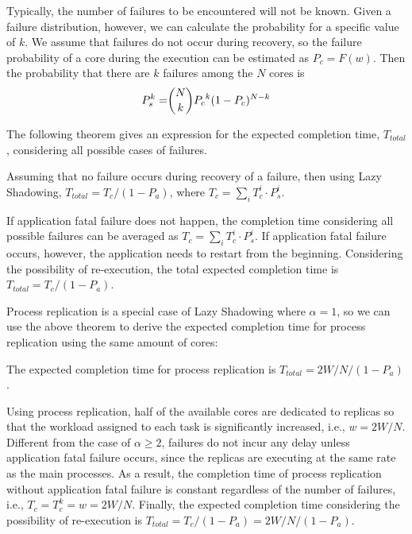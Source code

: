 Typically, the number of failures to be encountered will not be known. Given a failure distribution, however, we can calculate the probability for a specific value of $k$. We assume that failures do not occur during recovery, so the failure probability of a core during the execution can be estimated as $P_c = F(w)$. Then the probability that there are $k$ failures among the $N$ cores is 
\begin{equation}
\begin{split}
P_s^{k}= & \dbinom{N}{k}{P_c}^k(1-P_c)^{N-k} \\
\end{split}
\end{equation}

The following theorem gives an expression for the expected completion time, $T_{total}$, considering all possible cases of failures. 

\begin{theorem}
Assuming that no failure occurs during recovery of a failure, then using Lazy Shadowing,
$T_{total} = T_{c} / (1 - P_a)$, where $T_{c} = \sum_{i} T_{c}^{i} \cdot P_s^{i}$.
\end{theorem}
\begin{IEEEproof}
If application fatal failure does not happen, the completion time considering all possible failures can be averaged as $T_{c} = \sum_{i} T_{c}^{i} \cdot P_s^{i}$. If application fatal failure occurs, however, the application needs to restart from the beginning. Considering the possibility of re-execution, the total expected completion time is $T_{total} = T_{c} / (1 - P_a)$.
\end{IEEEproof}

Process replication is a special case of Lazy Shadowing where $\alpha=1$, so we can use the above theorem to derive the expected completion time for process replication using the same amount of cores:

\begin{corollary}
The expected completion time for process replication is $T_{total} = 2W/N / (1 - P_a)$.
\end{corollary}
\begin{IEEEproof}
Using process replication, half of the available cores are dedicated to replicas so that the workload assigned to each task is significantly increased, i.e., $w=2W/N$. Different from the case of $\alpha \ge 2$, failures do not incur any delay unless application fatal failure occurs, since the replicas are executing at the same rate as the main processes. As a result, the completion time of process replication without application fatal failure is constant regardless of the number of failures, i.e., $T_c=T_c^k=w=2W/N$. Finally, the expected completion time considering the possibility of re-execution is $T_{total} = T_c / (1 - P_a) = 2W/N / (1 - P_a)$.
\end{IEEEproof}

